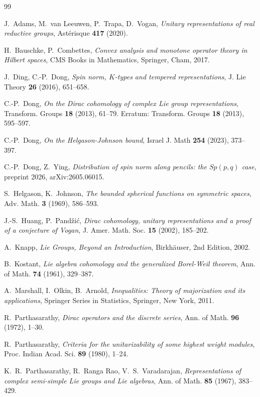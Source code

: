 \documentclass[11pt]{amsart}
\theoremstyle{plain}
\theoremstyle{definition}
\begin{document}
\begin{thebibliography}{99}
	
 J.~Adams, M.~van Leeuwen, P.~Trapa, D.~Vogan, \emph{Unitary representations of real reductive groups}, Ast{\'erisque} \textbf{417} (2020).	

 H.~Bauschke, P.~Combettes, \emph{Convex analysis and monotone operator theory in Hilbert spaces}, CMS Books in Mathematics, Springer, Cham, 2017.

 J.~Ding, C.-P.~Dong, \emph{Spin norm, $K$-types and tempered representations}, J.  Lie Theory
\textbf{26} (2016), 651--658.
	
 C.-P.~Dong,
	\emph{On the Dirac cohomology of complex Lie group representations},
	Transform. Groups \textbf{18} (2013), 61--79. Erratum: Transform.
	Groups \textbf{18} (2013), 595--597.
	
C.-P.~Dong, \emph{On the Helgason-Johnson bound}, Israel J. Math \textbf{254} (2023), 373--397.
	
 C.-P.~Dong, Z.~Ying,
\emph{Distribution of spin norm along pencils: the $Sp(p, q)$ case},
preprint 2026, arXiv:2605.06015.	
	
	
 S.~Helgason, K.~Johnson, \emph{The bounded spherical functions on symmetric spaces}, Adv. Math.
	\textbf{3} (1969), 586--593.

 J.-S.~Huang, P.~Pand\v zi\'c, \emph{Dirac
cohomology, unitary representations and a proof of a conjecture of
Vogan}, J. Amer. Math. Soc.  \textbf{15} (2002), 185--202.

 A.~Knapp, \emph{Lie Groups, Beyond an Introduction}, Birkh\"{a}user, 2nd Edition, 2002.

 B.~Kostant, \emph{Lie algebra cohomology and the generalized Borel-Weil theorem},
Ann. of Math. \textbf{74} (1961), 329--387.

  A.~Marshall, I.~Olkin, B.~Arnold, \emph{Inequalities: Theory of majorization and its applications}, Springer Series in Statistics, Springer, New York, 2011.

 R.~Parthasarathy, \emph{Dirac operators and the discrete
series}, Ann. of Math. \textbf{96} (1972), 1--30.

 R.~Parthasarathy,
\emph{Criteria for the unitarizability of some highest weight
modules}, Proc. Indian Acad. Sci. \textbf{89} (1980), 1--24.

 K.~R.~Parthasarathy, R.~Ranga Rao,
V.~S.~Varadarajan, \emph{Representations of complex semi-simple Lie
groups and Lie algebras}, Ann. of Math. \textbf{85} (1967),
383--429.
	

\end{thebibliography}
\end{document}
